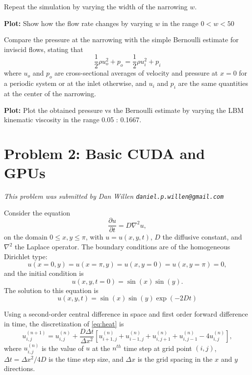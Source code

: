 \documentclass[11pt]{article}
\begin{document}
    Repeat the simulation by varying the width of the narrowing $w$.

    \textbf{Plot:}
    Show how the flow rate changes by varying $w$ in the range $0<w<50$

    Compare the pressure at the narrowing with the simple Bernoulli estimate for inviscid flows, stating that
    $$
    \frac{1}{2} \rho u_o^2 + p_o = \frac{1}{2} \rho u_i^2 + p_i
    $$
    where $u_o$ and $p_o$ are cross-sectional averages of velocity and pressure at $x=0$ for a periodic system 
    or at the inlet otherwise, and $u_i$ and $p_i$ are the same quantities at the center of the narrowing. 
    
    \textbf{Plot:}
    Plot the obtained pressure vs the Bernoulli estimate by varying the LBM kinematic viscosity in the range 0.05 : 0.1667.

  \section{Problem 2:  Basic CUDA and GPUs}
    \textit{This problem was submitted by Dan Willen \texttt{daniel.p.willen@gmail.com}}

    Consider the equation
    \begin{equation}\label{eq:heat}
      \frac{\partial u}{\partial t} = D \nabla^2 u,
    \end{equation}
    on the domain \(0 \leq x,y \leq \pi\), with \(u = u(x,y,t)\), \(D\) the diffusive constant, and \(\nabla^2\) the Laplace operator.
    The boundary conditions are of the homogeneous Dirichlet type:
    \begin{equation}
      u(x = 0, y) = u(x = \pi, y) = u(x, y = 0) = u(x, y = \pi) = 0,
    \end{equation}
    and the initial condition is
    \begin{equation}
      u(x,y, t = 0) = \sin(x) \sin(y).
    \end{equation}
    The solution to this equation is
    \begin{equation}
      u(x,y,t) = \sin(x) \sin(y) \exp{(-2Dt)}
    \end{equation}
    
    Using a second-order central difference in space and first order forward difference in time, the discretization of \eqref{eq:heat} is
    \begin{equation}
      u_{i,j}^{\left(n+1\right)} = u_{i,j}^{\left(n\right)} + \frac{D \Delta t}{\Delta x^2} 
        \left[u_{i+1, j}^{\left(n\right)} +
              u_{i-1, j}^{\left(n\right)} +
              u_{i, j+1}^{\left(n\right)} +
              u_{i, j-1}^{\left(n\right)} -
              4u_{i, j}^{\left(n\right)} \right],
    \end{equation}
    where \(u_{i,j}^{\left(n\right)}\) is the value of \(u\) at the \(n^{th}\) time step at grid point \((i,j)\), \(\Delta t = \Delta x^2 / 4D\) is the time step size, and \(\Delta x\) is the grid spacing in the \(x\) and \(y\) directions.
    
\end{document}
